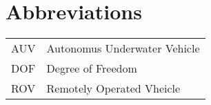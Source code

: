 \chapter{Abbreviations}
\begin{center}
\begin{tabular}{|l|l|}
\hline
AUV & Autonomus Underwater Vehicle \\
DOF & Degree of Freedom \\
ROV & Remotely Operated Vheicle \\
\hline
\end{tabular}
\end{center}